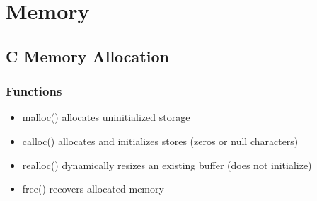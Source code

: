 \chapter{Memory}

\section{C Memory Allocation}

\subsection{Functions}

\begin{itemize}
	\item malloc() allocates uninitialized storage
	\item calloc() allocates and initializes stores (zeros or null characters)
	\item realloc() dynamically resizes an existing buffer (does not initialize)
	\item free() recovers allocated memory
\end{itemize}